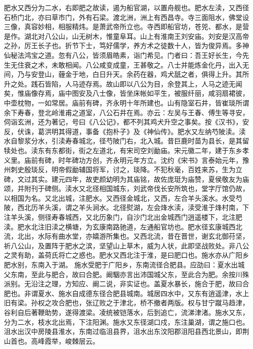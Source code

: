 \documentclass[12pt,UTF8]{ctexbook}
\begin{document}
肥水又西分为二水，右即肥之故读，遏为船官湖，以置舟舰也。肥水左渎，又西径石桥门北，亦曰草市门，外有石梁。渡北洲，洲上有西昌寺。寺三面阻水，佛堂设三像，真容妙相，相服精炜。是萧武帝所立也。寺西即船官坊，苍兕、都水，是营是作。湖北对八公山，山无树木，惟童阜耳。山上有淮南王刘安庙。刘安是汉高帝之孙，厉王长子也。折节下士，笃好儒学，养方术之徒数十人，皆为俊异焉。多神仙秘法鸿宝之道。忽有八公，皆须眉皓素，诣门希见。门者曰：吾王好长生，今先生无住衰之术，未敢相闻。八公咸变成童，王甚敬之。八士并能炼金化丹，出入无间，乃与安登山，薶金于地，白日升天。余药在器，鸡犬舐之者，俱得上升。其所升之处。践石皆陷，人马迹存焉。故山即以八公为目，余登其上，人马之迹无闻矣，惟庙像存焉，庙中图安及八士像，皆坐床帐如平生，被服纤丽，咸羽扇裙彼，中壶枕物，一如常居。庙前有碑，齐永明十年所建也。山有隐室石井，皆崔琰所谓余下寿春，登北岭淮甫之道室，八公石井在焉。亦云：左吴与王春、傅生等寻安，伺诣玄洲，还为著记，号曰《八公记》，都不列其鸡犬升空之事矣。按《汉书》，安反，伏诛，葛洪明其得道，事备《抱朴子》及《神仙传》。肥水又左纳芍陂渎。渎水自黎浆分水，引渎寿春城北，径芍陂门右，北入城。昔巨鹿时苗为县长，是其留犊处也。渎东有东都街，街之左道北，有宋司空刘勔庙。宋元徽二年，建于东乡孝义里。庙前有碑，时年碑功方创，齐永明元年方立。沈约《宋书》言泰始元年，豫州刺史殷琰反，明帝假勔辅国将军，讨之，琰降。不犯秋毫，百姓来苏，生为立碑，文过其实。建元四年，故吏颜幼明为其庙铭，故佐庞珽为庙赞，夏侯敬友为庙颂，并附刊于碑侧。渎水又北径相国城东，刘武帝伐长安所筑也，堂字厅馆仍故，以相国为名。又北出城，注肥水。又西径金城北，又西，左合羊头溪水。水受芍陂，西北历羊头溪，谓之羊头涧水。北径熨湖，左会烽水渎，渎受淮于烽村南，下注羊头溪，侧径寿春城西，又北历象门，自沙门北出金城西门逍遥楼下，北注肥渎。肥水北注旧渎之横塘，为玄康南路驰道，左通船官坊也。肥水径玄康城西北流，北出，水际有曲水堂，亦嬉游所集也。又西北流，昔在晋世，谢玄北御苻坚，祈八公山，及置阵于肥水之滨，坚望山上草木，威为人状，此即坚战败处。非八公之灵有助，盖荷氏将亡之惑也。肥水又西北注于淮，是曰肥口也。施水亦从广阳乡肥水别，东南入于湖。
施水受肥于广阳乡，东南流径合肥县。应劭曰：夏水出城父东南，至此与肥合，故曰合肥。阚駰亦言出沛国城父东，至此合为肥。余按川殊派别。无沿注之理，方知应、阚二说，非实证也。盖夏水暴长，施合于肥，故曰合肥也。非谓夏水、施水自成德东径合肥县城南。城居四水中，又东有逍遥津，水上旧有梁。孙权之攻合肥也，张辽败之于津北，桥不撤者两版。权与甘宁蹴马趋津，谷利自后著鞭助势，遂得渡梁。凌统被铠落水，后到追亡，流涕津渚。施水又东，分为二水，枝水北出焉，下注阳渊。施水又东径湖口戍，东注巢湖，谓之施口也。
沮水出汉中房陵县淮水，东南过临沮县界，沮水出东汶阳郡沮阳县西北景山，即荆山首也。高峰霞举，峻棘层云。
\end{document}
